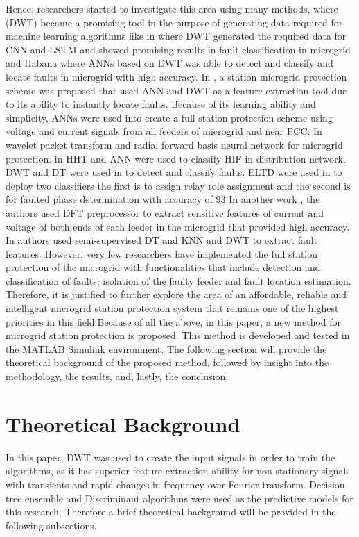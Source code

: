 \documentclass[8pt,a4paper,oneside]{elsarticle}
\begin{document}
Hence, researchers started to investigate this area using many methods, where (DWT) became a promising tool in the purpose of generating data required for machine learning algorithms like in \cite{9285101_9} where DWT generated the required data for CNN and LSTM and showed promising results in fault classification in microgrid and Habana \cite{hubana9066305_10} where ANNs based on DWT was able to detect and classify and locate faults
in microgrid with high accuracy. In \cite{8759044_11}, a station microgrid protection scheme was proposed that used ANN and DWT as a feature extraction tool due to its ability to instantly locate faults.  Because of its learning ability and simplicity, ANNs were used in\cite{hubana9066305_10}to create a full station protection scheme using voltage and current signals from all feeders of microgrid and
\cite{8759044_11} near PCC. In \cite{8759044_12} wavelet packet transform and radial forward basis neural network for microgrid protection.
in \cite{10.1007/978-3-030-02574-8_10_13} HHT and ANN were used to classify HIF in distribution network.  DWT and DT were used in \cite{10.1109/tsg.2015.2487501_14} to detect and classify faults. ELTD were used in \cite{10.1109/ipaps52181.2020.9375534_15} to deploy two classifiers the first is to assign relay role assignment and the second is for faulted phase determination with accuracy of 93%
In another work \cite{10.1109/jsyst.2014.2380432_16}, the authors used DFT preprocessor to extract sensitive features of current and voltage of both ends of each feeder in the microgrid that provided high accuracy. In \cite{10.1109/tie.2017.2726961_17} authors used semi-supervised DT and KNN and DWT to extract fault features. However, very few researchers have implemented the full station protection of the microgrid with functionalities that include detection and classification of faults, isolation of the faulty feeder and fault location estimation. Therefore, it is
justified to further explore the area of an affordable, reliable and intelligent microgrid station protection system that remains one of the highest priorities in this field.Because of all the above, in this paper, a new method for microgrid station protection is proposed. This method is developed and tested in the MATLAB Simulink environment. The following section will provide the theoretical background of the proposed method, followed by insight into the methodology, the results, and, lastly, the conclusion.
\section{Theoretical Background}\label{Theoretical Background}
In this paper, DWT was used to create the input signals in order to  train the algorithms, as it has superior feature extraction ability for non-stationary signals with transients and rapid changes in frequency over Fourier transform. Decision tree ensemble and Discriminant algorithms were used as the predictive models for this research, Therefore a brief theoretical background will be provided in the following subsections.
\end{document}
